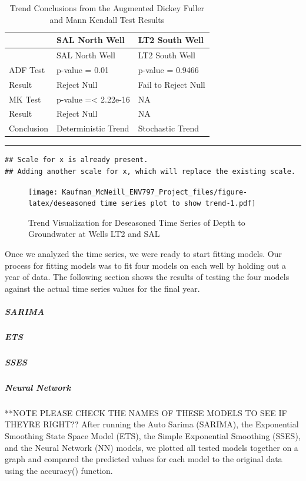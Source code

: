 \documentclass[
]{article}
\begin{document}
\begin{longtable}[]{@{}lll@{}}
\caption{Trend Conclusions from the Augmented Dickey Fuller and Mann
Kendall Test Results}\tabularnewline
\toprule\noalign{}
& SAL North Well & LT2 South Well \\
\midrule\noalign{}
\endfirsthead
\toprule\noalign{}
& SAL North Well & LT2 South Well \\
\midrule\noalign{}
\endhead
\bottomrule\noalign{}
\endlastfoot
ADF Test & p-value = 0.01 & p-value = 0.9466 \\
Result & Reject Null & Fail to Reject Null \\
MK Test & p-value =\textless{} 2.22e-16 & NA \\
Result & Reject Null & NA \\
Conclusion & Deterministic Trend & Stochastic Trend \\
\end{longtable}

\begin{center}\rule{0.5\linewidth}{0.5pt}\end{center}

\begin{verbatim}
## Scale for x is already present.
## Adding another scale for x, which will replace the existing scale.
\end{verbatim}

\begin{figure}
\centering
\texttt{[image: Kaufman\_McNeill\_ENV797\_Project\_files/figure-latex/deseasoned time series plot to show trend-1.pdf]}
\caption{Trend Visualization for Deseasoned Time Series of Depth to
Groundwater at Wells LT2 and SAL}
\end{figure}

Once we analyzed the time series, we were ready to start fitting models.
Our process for fitting models was to fit four models on each well by
holding out a year of data. The following section shows the results of
testing the four models against the actual time series values for the
final year.

\hypertarget{sarima}{%
\subparagraph{SARIMA}\label{sarima}}

\hypertarget{ets}{%
\subparagraph{ETS}\label{ets}}

\hypertarget{sses}{%
\subparagraph{SSES}\label{sses}}

\hypertarget{neural-network}{%
\subparagraph{Neural Network}\label{neural-network}}

**NOTE PLEASE CHECK THE NAMES OF THESE MODELS TO SEE IF THEYRE RIGHT??
After running the Auto Sarima (SARIMA), the Exponential Smoothing State
Space Model (ETS), the Simple Exponential Smoothing (SSES), and the
Neural Network (NN) models, we plotted all tested models together on a
graph and compared the predicted values for each model to the original
data using the accuracy() function.
\end{document}

